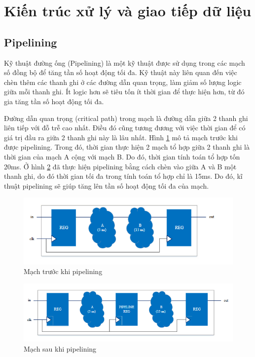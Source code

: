\section{Kiến trúc xử lý và giao tiếp dữ liệu}
\subsection{Pipelining}
Kỹ thuật đường ống (Pipelining) là một kỹ thuật được sử dụng trong các mạch số đồng bộ để tăng tần số hoạt động tối đa. Kỹ thuật này liên quan đến việc chèn thêm các thanh ghi ở các đường dẫn quan trọng, làm giảm số lượng logic giữa mỗi thanh ghi. Ít logic hơn sẽ tiêu tốn ít thời gian để thực hiện hơn, từ đó gia tăng tần số hoạt động tối đa.

Đường dẫn quan trọng (critical path) trong mạch là đường dẫn giữa 2 thanh ghi liên tiếp với đỗ trễ cao nhất. Điều đó cũng tương đương với việc thời gian để có giá trị đầu ra giữa 2 thanh ghi này là lâu nhất.  Hình \ref{fig:pipeline1} mô tả mạch trước khi được pipelining. Trong đó, thời gian thực hiện 2 mạch tổ hợp giữa 2 thanh ghi là thời gian của mạch A cộng với mạch B. Do đó, thời gian tính toán tổ hợp tốn 20ms. Ở hình \ref{fig:pipeline2} đã thực hiện pipelining bằng cách chèn vào giữa A và B một thanh ghi, do đó thời gian tối đa trong tính toán tổ hợp chỉ là 15ms. Do đó, kĩ thuật pipelining sẽ giúp tăng lên tần số hoạt động tối đa của mạch. 
\begin{figure}[!ht]
    \centering
    \includegraphics[width=\linewidth]{figures/pipeline1.png}
    \caption{Mạch trước khi pipelining}
    \label{fig:pipeline1}
\end{figure}
\begin{figure}[!ht]
    \centering
    \includegraphics[width=\linewidth]{figures/pipeline2.png}
    \caption{Mạch sau khi pipelining}
    \label{fig:pipeline2}
\end{figure}
